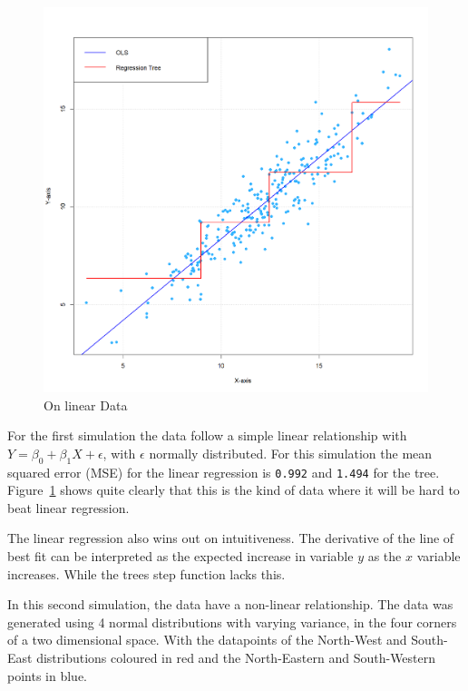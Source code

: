 \documentclass[12pt]{article}
\begin{document}
\begin{figure}
    \centering
    \includegraphics[scale=0.25]{OLS vs Tree.png}
    \caption{On linear Data}
    \label{OLS_VS_TREE}
\end{figure}

For the first simulation the data follow a simple linear relationship with $Y = \beta_0 + \beta_1X + \epsilon$, with $\epsilon$ normally distributed. For this simulation the mean squared error (MSE) for the linear regression is \texttt{0.992} and \texttt{1.494} for the tree. Figure~\ref{OLS_VS_TREE} shows quite clearly that this is the kind of data where it will be hard to beat linear regression.

The linear regression also wins out on intuitiveness. The derivative of the line of best fit can be interpreted as the expected increase in variable $y$ as the $x$ variable increases. While the trees step function lacks this.

In this second simulation, the data have a non-linear relationship. The data was generated using 4 normal distributions with varying variance, in the four corners of a two dimensional space. With the datapoints of the North-West and South-East distributions coloured in red and the North-Eastern and South-Western points in blue.
\end{document}
